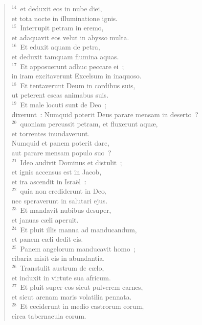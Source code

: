 \begin{verse}
${}^{14}$~et deduxit eos in nube diei,\\ et tota nocte in illuminatione ignis.\\
${}^{15}$~Interrupit petram in eremo,\\ et adaquavit eos velut in abysso multa.\\
${}^{16}$~Et eduxit aquam de petra,\\ et deduxit tamquam flumina aquas.\\
${}^{17}$~Et apposuerunt adhuc peccare ei~;\\ in iram excitaverunt Excelsum in inaquoso.\\
${}^{18}$~Et tentaverunt Deum in cordibus suis,\\ ut peterent escas animabus suis.\\
${}^{19}$~Et male locuti sunt de Deo~;\\ dixerunt~: Numquid poterit Deus parare mensam in deserto~?\\
${}^{20}$~quoniam percussit petram, et fluxerunt aqu\ae ,\\ et torrentes inundaverunt.\\ Numquid et panem poterit dare,\\ aut parare mensam populo suo~?\\
${}^{21}$~Ideo audivit Dominus et distulit~;\\ et ignis accensus est in Jacob,\\ et ira ascendit in Isra\"el~:\\
${}^{22}$~quia non crediderunt in Deo,\\ nec speraverunt in salutari ejus.\\
${}^{23}$~Et mandavit nubibus desuper,\\ et januas c\ae li aperuit.\\
${}^{24}$~Et pluit illis manna ad manducandum,\\ et panem c\ae li dedit eis.\\
${}^{25}$~Panem angelorum manducavit homo~;\\ cibaria misit eis in abundantia.\\
${}^{26}$~Transtulit austrum de c\ae lo,\\ et induxit in virtute sua africum.\\
${}^{27}$~Et pluit super eos sicut pulverem carnes,\\ et sicut arenam maris volatilia pennata.\\
${}^{28}$~Et ceciderunt in medio castrorum eorum,\\ circa tabernacula eorum.\\

\end{verse}
